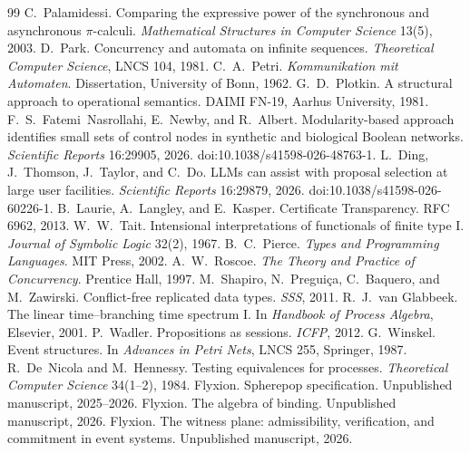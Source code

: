 \documentclass[11pt,openany]{book}
\theoremstyle{remark}
\begin{document}
\begin{thebibliography}{99}
 C.~Palamidessi. Comparing the expressive power of the synchronous and asynchronous $\pi$-calculi. \emph{Mathematical Structures in Computer Science} 13(5), 2003.
 D.~Park. Concurrency and automata on infinite sequences. \emph{Theoretical Computer Science}, LNCS 104, 1981.
 C.~A.~Petri. \emph{Kommunikation mit Automaten}. Dissertation, University of Bonn, 1962.
 G.~D.~Plotkin. A structural approach to operational semantics. DAIMI FN-19, Aarhus University, 1981.
 F.~S.~Fatemi~Nasrollahi, E.~Newby, and R.~Albert. Modularity-based approach identifies small sets of control nodes in synthetic and biological Boolean networks. \emph{Scientific Reports} 16:29905, 2026. doi:10.1038/s41598-026-48763-1.
 L.~Ding, J.~Thomson, J.~Taylor, and C.~Do. LLMs can assist with proposal selection at large user facilities. \emph{Scientific Reports} 16:29879, 2026. doi:10.1038/s41598-026-60226-1.
 B.~Laurie, A.~Langley, and E.~Kasper. Certificate Transparency. RFC 6962, 2013.
 W.~W.~Tait. Intensional interpretations of functionals of finite type I. \emph{Journal of Symbolic Logic} 32(2), 1967.
 B.~C.~Pierce. \emph{Types and Programming Languages}. MIT Press, 2002.
 A.~W.~Roscoe. \emph{The Theory and Practice of Concurrency}. Prentice Hall, 1997.
 M.~Shapiro, N.~Pregui\c{c}a, C.~Baquero, and M.~Zawirski. Conflict-free replicated data types. \emph{SSS}, 2011.
 R.~J.~van Glabbeek. The linear time--branching time spectrum I. In \emph{Handbook of Process Algebra}, Elsevier, 2001.
 P.~Wadler. Propositions as sessions. \emph{ICFP}, 2012.
 G.~Winskel. Event structures. In \emph{Advances in Petri Nets}, LNCS 255, Springer, 1987.
 R.~De~Nicola and M.~Hennessy. Testing equivalences for processes. \emph{Theoretical Computer Science} 34(1--2), 1984.
 Flyxion. Spherepop specification. Unpublished manuscript, 2025--2026.
 Flyxion. The algebra of binding. Unpublished manuscript, 2026.
 Flyxion. The witness plane: admissibility, verification, and commitment in event systems. Unpublished manuscript, 2026.
\end{thebibliography}
\end{document}

